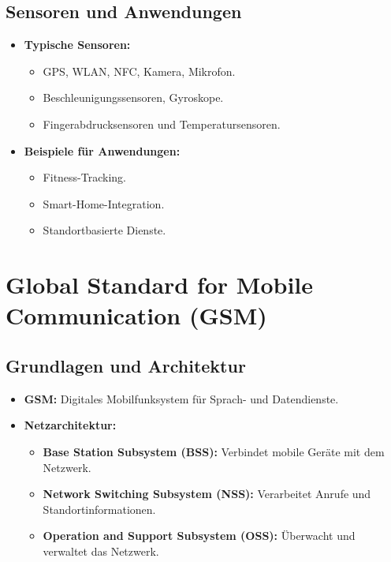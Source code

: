\documentclass{article}
\begin{document}
\subsection{Sensoren und Anwendungen}
\begin{itemize}
    \item \textbf{Typische Sensoren:}
    \begin{itemize}
        \item GPS, WLAN, NFC, Kamera, Mikrofon.
        \item Beschleunigungssensoren, Gyroskope.
        \item Fingerabdrucksensoren und Temperatursensoren.
    \end{itemize}
    \item \textbf{Beispiele für Anwendungen:}
    \begin{itemize}
        \item Fitness-Tracking.
        \item Smart-Home-Integration.
        \item Standortbasierte Dienste.
    \end{itemize}
\end{itemize}



\section{Global Standard for Mobile Communication (GSM)}

\subsection{Grundlagen und Architektur}
\begin{itemize}
    \item \textbf{GSM:} Digitales Mobilfunksystem für Sprach- und Datendienste.
    \item \textbf{Netzarchitektur:}
    \begin{itemize}
        \item \textbf{Base Station Subsystem (BSS):} Verbindet mobile Geräte mit dem Netzwerk.
        \item \textbf{Network Switching Subsystem (NSS):} Verarbeitet Anrufe und Standortinformationen.
        \item \textbf{Operation and Support Subsystem (OSS):} Überwacht und verwaltet das Netzwerk.
    \end{itemize}
\end{itemize}
\end{document}
